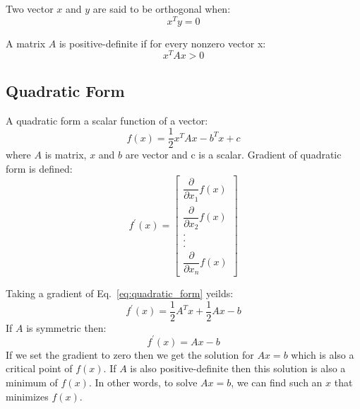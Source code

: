 \documentclass[en]{minipw} %
\begin{document}
Two vector $x$ and $y$ are said to be orthogonal when:
\begin{equation}
x^{T}y = 0
\end{equation}

A matrix $A$ is positive-definite if for every nonzero vector x:
\begin{equation}
x^{T}Ax > 0
\end{equation}

\subsection{Quadratic Form}
A quadratic form a scalar function of a vector:
\begin{equation}
\label{eq:quadratic_form}
f(x) = \dfrac{1}{2}x^{T}Ax - b^{T}x + c
\end{equation}
where $A$ is matrix, $x$ and $b$ are vector and c is a scalar.
Gradient of quadratic form is defined:
\begin{equation}
\label{eq:gradient_f}
f^{'}(x) = 
\begin{bmatrix}
\dfrac{\partial}{\partial x_1} f(x) \\
\dfrac{\partial}{\partial x_2} f(x) \\
. \\
. \\
. \\
\dfrac{\partial}{\partial x_n} f(x)
\end{bmatrix}
\end{equation}

Taking a gradient of Eq.~\ref{eq:quadratic_form} yeilds:
\begin{equation}
f^{'}(x) = \dfrac{1}{2}A^{T}x + \dfrac{1}{2}Ax - b
\end{equation}
If $A$ is symmetric then:
\begin{equation}
f^{'}(x) = Ax - b
\end{equation}
If we set the gradient to zero then we get the solution for $Ax=b$ which is also a critical point of $f(x)$. If $A$ is also positive-definite then this solution is also a minimum of $f(x)$. In other words, to solve $Ax=b$, we can find such an $x$ that minimizes $f(x)$.
\end{document}

